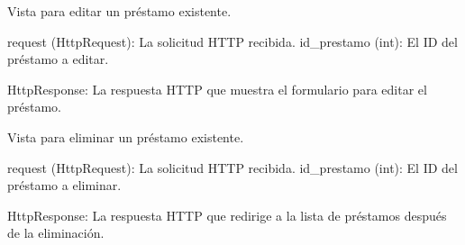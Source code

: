 \documentclass[letterpaper,10pt,spanish]{sphinxmanual}
\begin{document}
\begin{fulllineitems}
\label{\detokenize{modules/appprestamos:appprestamos.views.editar_prestamo}}
\pysigstartsignatures
{}
\pysigstopsignatures
\sphinxAtStartPar
Vista para editar un préstamo existente.
\begin{description}
\sphinxAtStartPar
request (HttpRequest): La solicitud HTTP recibida.
id\_prestamo (int): El ID del préstamo a editar.

\sphinxAtStartPar
HttpResponse: La respuesta HTTP que muestra el formulario para editar el préstamo.

\end{description}

\end{fulllineitems}


\begin{fulllineitems}
\label{\detokenize{modules/appprestamos:appprestamos.views.eliminar_prestamo}}
\pysigstartsignatures
{}
\pysigstopsignatures
\sphinxAtStartPar
Vista para eliminar un préstamo existente.
\begin{description}
\sphinxAtStartPar
request (HttpRequest): La solicitud HTTP recibida.
id\_prestamo (int): El ID del préstamo a eliminar.

\sphinxAtStartPar
HttpResponse: La respuesta HTTP que redirige a la lista de préstamos después de la eliminación.

\end{description}

\end{fulllineitems}

\end{document}
